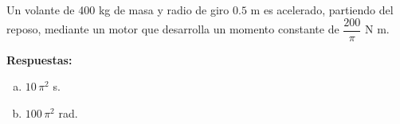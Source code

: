 \documentclass[addpoints]{exam}
\newcommand{\rtas}{\textbf{Respuestas: }}
\begin{document}
\begin{questions}
    \question Un volante de 400 kg de masa y radio de giro $0.5$ m es acelerado, partiendo del reposo, mediante un motor que desarrolla un momento constante de $\dfrac{200}{\pi}$ N m.

    \rtas
    \begin{enumerate}[(a)]
        \item $10 \, \pi^2$ s.
        \item $100 \, \pi^2$ rad.
    \end{enumerate}




\end{questions}
\end{document}
